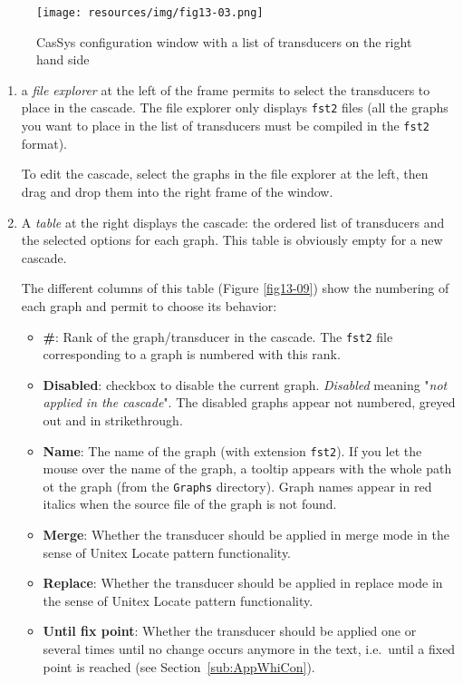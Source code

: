 \begin{figure}[!htb]
  \centering
  \texttt{[image: resources/img/fig13-03.png]}
  \caption{CasSys configuration window with a list of transducers on the right hand side}
  \label{fig13-03}
\end{figure}

\begin{enumerate}
	\item a \textit{file explorer} at the left of the frame permits to select the transducers to place in the cascade. 
	The file explorer only displays \verb+fst2+ files (all the graphs you want to place in the list of transducers must be compiled in the \verb+fst2+ format). 
	
	To edit the cascade, select the graphs in the file explorer at the left, then drag and drop them into the right frame of the window.
	\item A \textit{table} at the right displays the cascade: the ordered list of transducers and the selected options for each graph.
		This table is obviously empty for a new cascade. 
	 
	The different columns of this table (Figure \ref{fig13-09}) show the numbering of each graph and permit to choose its behavior:
	\begin{itemize}
		  \item \textbf{\#}: Rank of the graph/transducer in the cascade. The \verb+fst2+ file corresponding to a graph is numbered with this rank.
		  \item \textbf{Disabled}: checkbox to disable the current graph. \textit{Disabled} meaning "\textit{not applied in the cascade}". The disabled graphs appear not numbered, greyed out and in strikethrough.
			\item \textbf{Name}: The name of the graph (with extension \verb+fst2+). If you let the mouse over the name of the graph, a tooltip appears with the whole path ot the graph (from the \verb+Graphs+ directory). Graph names appear in red italics when the source file of the graph is not found.
		  \item \textbf{Merge}: Whether the transducer should be applied in merge mode in the sense of Unitex Locate pattern functionality.
			\item \textbf{Replace}: Whether the transducer should be applied in replace mode in the sense of Unitex Locate pattern functionality.
		  \item \textbf{Until fix point}: Whether the transducer should be applied one or several times until no change occurs anymore in the text, i.e.\ until a fixed point is reached (see Section~\ref{sub:AppWhiCon}).
	\end{itemize}


\end{enumerate}
